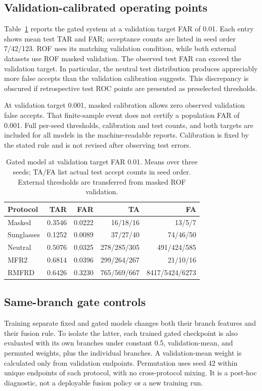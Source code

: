 \documentclass[10pt,journal,compsoc]{IEEEtran}
\begin{document}
\subsection{Validation-calibrated operating points}
Table~\ref{tab:calibration} reports the gated system at a validation target FAR of 0.01. Each entry shows mean test TAR and FAR; acceptance counts are listed in seed order 7/42/123. ROF uses its matching validation condition, while both external datasets use ROF masked validation. The observed test FAR can exceed the validation target. In particular, the neutral test distribution produces appreciably more false accepts than the validation calibration suggests. This discrepancy is obscured if retrospective test ROC points are presented as preselected thresholds.

At validation target 0.001, masked calibration allows zero observed validation false accepts. That finite-sample event does not certify a population FAR of 0.001. Full per-seed thresholds, calibration and test counts, and both targets are included for all models in the machine-readable reports. Calibration is fixed by the stated rule and is not revised after observing test errors.
\begin{table}[t]
\centering
\caption{Gated model at validation target FAR 0.01. Means over three seeds; TA/FA list actual test accept counts in seed order. External thresholds are transferred from masked ROF validation.}
\label{tab:calibration}
\begin{tabular}{lrrrr}
\toprule
Protocol & TAR & FAR & TA & FA\\
\midrule
Masked & 0.3546 & 0.0222 & 16/18/16 & 13/5/7\\
Sunglasses & 0.1252 & 0.0089 & 37/27/40 & 74/46/50\\
Neutral & 0.5076 & 0.0325 & 278/285/305 & 491/424/585\\
MFR2 & 0.6814 & 0.0396 & 299/264/267 & 21/10/16\\
RMFRD & 0.6426 & 0.3230 & 765/569/667 & 8417/5424/6273\\
\bottomrule
\end{tabular}
\end{table}

\subsection{Same-branch gate controls}
Training separate fixed and gated models changes both their branch features and their fusion rule. To isolate the latter, each trained gated checkpoint is also evaluated with its own branches under constant 0.5, validation-mean, and permuted weights, plus the individual branches. A validation-mean weight is calculated only from validation endpoints. Permutation uses seed 42 within unique endpoints of each protocol, with no cross-protocol mixing. It is a post-hoc diagnostic, not a deployable fusion policy or a new training run.
\end{document}
